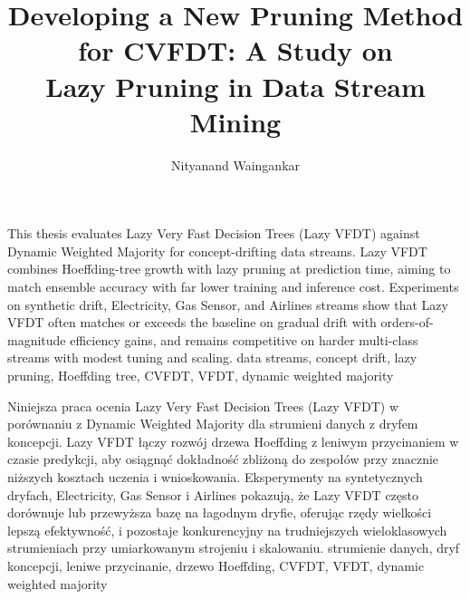 \documentclass[
    bindingoffset=5mm,  %
    footnoteindent=3mm, %
    hyphenation=true    %
]{src/wut-thesis}
\begin{document}
\title{Developing a New Pruning Method for CVFDT: A Study on\\Lazy Pruning in Data Stream Mining}
\author{Nityanand Waingankar}
\date{\the\year}
\maketitle

\cleardoublepage %
\abstract
This thesis evaluates Lazy Very Fast Decision Trees (Lazy VFDT) against Dynamic Weighted Majority for concept-drifting data streams. Lazy VFDT combines Hoeffding-tree growth with lazy pruning at prediction time, aiming to match ensemble accuracy with far lower training and inference cost. Experiments on synthetic drift, Electricity, Gas Sensor, and Airlines streams show that Lazy VFDT often matches or exceeds the baseline on gradual drift with orders-of-magnitude efficiency gains, and remains competitive on harder multi-class streams with modest tuning and scaling.
\keywords data streams, concept drift, lazy pruning, Hoeffding tree, CVFDT, VFDT, dynamic weighted majority


\clearpage
\secondabstract
Niniejsza praca ocenia Lazy Very Fast Decision Trees (Lazy VFDT) w porównaniu z Dynamic Weighted Majority dla strumieni danych z dryfem koncepcji. Lazy VFDT łączy rozwój drzewa Hoeffding z leniwym przycinaniem w czasie predykcji, aby osiągnąć dokładność zbliżoną do zespołów przy znacznie niższych kosztach uczenia i wnioskowania. Eksperymenty na syntetycznych dryfach, Electricity, Gas Sensor i Airlines pokazują, że Lazy VFDT często dorównuje lub przewyższa bazę na łagodnym dryfie, oferując rzędy wielkości lepszą efektywność, i pozostaje konkurencyjny na trudniejszych wieloklasowych strumieniach przy umiarkowanym strojeniu i skalowaniu.
\secondkeywords strumienie danych, dryf koncepcji, leniwe przycinanie, drzewo Hoeffding, CVFDT, VFDT, dynamic weighted majority
\end{document}
